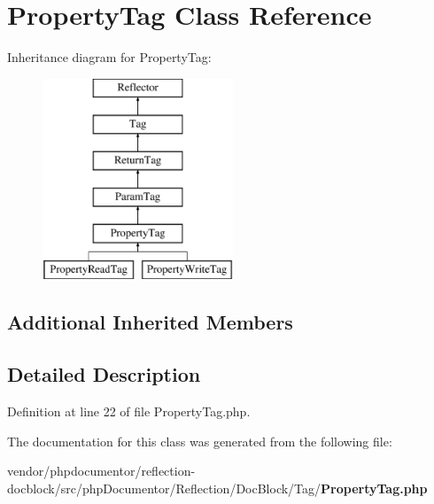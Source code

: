 \section{Property\+Tag Class Reference}
\label{classphp_documentor_1_1_reflection_1_1_doc_block_1_1_tag_1_1_property_tag}
Inheritance diagram for Property\+Tag\+:\begin{figure}[H]
\begin{center}
\leavevmode
\includegraphics[height=6.000000cm]{classphp_documentor_1_1_reflection_1_1_doc_block_1_1_tag_1_1_property_tag}
\end{center}
\end{figure}
\subsection*{Additional Inherited Members}


\subsection{Detailed Description}


Definition at line 22 of file Property\+Tag.\+php.



The documentation for this class was generated from the following file\+:\begin{DoxyCompactItemize}
\item 
vendor/phpdocumentor/reflection-\/docblock/src/php\+Documentor/\+Reflection/\+Doc\+Block/\+Tag/{\bf Property\+Tag.\+php}\end{DoxyCompactItemize}
